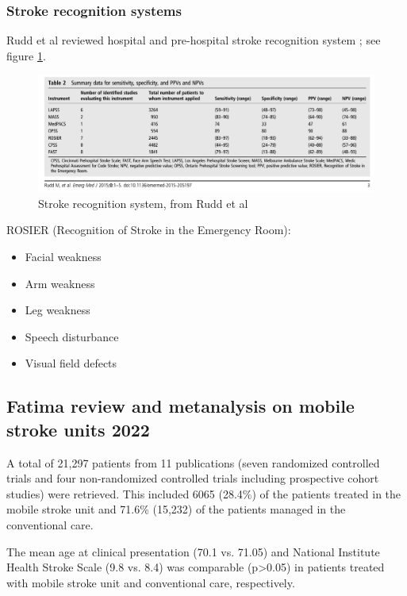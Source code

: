\subsubsection{Stroke recognition systems}

Rudd et al reviewed hospital and pre-hospital stroke recognition system \cite{rudd_systematic_2016}; see figure \ref{fig:rudd}.

\begin{figure}
    \centering
    \includegraphics[width=0.9\linewidth]{images_background/rudd.png}
    \caption{Stroke recognition system, from Rudd et al}
    \label{fig:rudd}
\end{figure}

ROSIER (Recognition of Stroke in the Emergency Room):

\begin{itemize}
    \item Facial weakness
    \item Arm weakness
    \item Leg weakness
    \item Speech disturbance
    \item Visual field defects
\end{itemize}




\subsection{Fatima review and metanalysis on mobile stroke units 2022 \cite{fatima_mobile_2020}
}

A total of 21,297 patients from 11 publications (seven randomized controlled trials and four non-randomized controlled trials including prospective cohort studies) were retrieved. This included 6065 (28.4\%) of the patients treated in the mobile stroke unit and 71.6\% (15,232) of the patients managed in the conventional care.

The mean age at clinical presentation (70.1 vs. 71.05) and National Institute Health Stroke Scale (9.8 vs. 8.4) was comparable (p>0.05) in patients treated with mobile stroke unit and conventional care, respectively.

